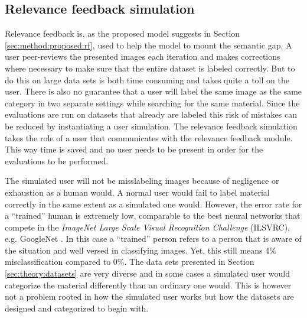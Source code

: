 \subsection{Relevance feedback simulation}
\label{sec:method:rf_simulation}
Relevance feedback is, as the proposed model suggests in Section \ref{sec:method:proposed:rf}, used to help the model to mount the semantic gap. A user peer-reviews the presented images each iteration and makes corrections where necessary to make sure that the entire dataset is labeled correctly. But to do this on large data sets is both time consuming and takes quite a toll on the user. There is also no guarantee that a user will label the same image as the same category in two separate settings while searching for the same material. 
Since the evaluations are run on datasets that already are labeled this risk of mistakes can be reduced by instantiating a user simulation. The relevance feedback simulation takes the role of a user that communicates with the relevance feedback module. This way time is saved and no user needs to be present in order for the evaluations to be performed.  

The simulated user will not be misslabeling images because of negligence or exhaustion as a human would. 
A normal user would fail to label material correctly in the same extent as a simulated one would. 
However, the error rate for a ``trained'' human is extremely low, comparable to the best neural networks that compete in the \emph{ImageNet Large Scale Visual Recognition Challenge} (ILSVRC), e.g. GoogleNet \cite{ImageNetChallenge}. 
In this case a ``trained'' person refers to a person that is aware of the situation and well versed in classifying images. Yet, this still means 4\% misclassification compared to 0\%.
The data sets presented in Section \ref{sec:theory:datasets} are very diverse and in some cases a simulated user would categorize the material differently than an ordinary one would. This is however not a problem rooted in how the simulated user works but how the datasets are designed and categorized to begin with.
